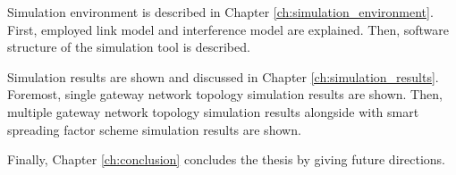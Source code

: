 Simulation environment is described in Chapter \ref{ch:simulation_environment}. First, employed link model and interference model are explained. Then, software structure of the simulation tool is described.

Simulation results are shown and discussed in Chapter \ref{ch:simulation_results}. Foremost, single gateway network topology simulation results are shown. Then, multiple gateway network topology simulation results alongside with smart spreading factor scheme simulation results are shown. 

Finally, Chapter \ref{ch:conclusion} concludes the thesis by giving future directions.
